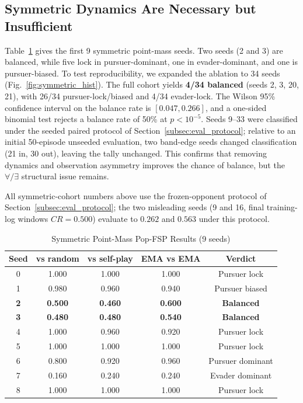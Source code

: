 \documentclass[letterpaper, 10pt, journal]{IEEEtran}
\begin{document}
\subsection{Symmetric Dynamics Are Necessary but Insufficient}
\label{subsec:symmetric_results}

Table~\ref{tab:symmetric} gives the first 9 symmetric point-mass seeds. Two seeds (2 and 3) are balanced, while five lock in pursuer-dominant, one in evader-dominant, and one is pursuer-biased. To test reproducibility, we expanded the ablation to 34 seeds (Fig.~\ref{fig:symmetric_hist}). The full cohort yields \textbf{4/34 balanced} (seeds 2, 3, 20, 21), with 26/34 pursuer-lock/biased and 4/34 evader-lock. The Wilson 95\% confidence interval on the balance rate is $[0.047, 0.266]$, and a one-sided binomial test rejects a balance rate of 50\% at $p < 10^{-5}$. Seeds 9--33 were classified under the seeded paired protocol of Section~\ref{subsec:eval_protocol}; relative to an initial 50-episode unseeded evaluation, two band-edge seeds changed classification (21 in, 30 out), leaving the tally unchanged. This confirms that removing dynamics and observation asymmetry improves the chance of balance, but the $\forall/\exists$ structural issue remains.

All symmetric-cohort numbers above use the frozen-opponent protocol of Section~\ref{subsec:eval_protocol}; the two misleading seeds (9 and 16, final training-log windows $CR=0.500$) evaluate to $0.262$ and $0.563$ under this protocol.

\begin{table}[h]
\centering
\caption{Symmetric Point-Mass Pop-FSP Results (9 seeds)}
\label{tab:symmetric}
\begin{tabular}{@{}ccccc@{}}
\toprule
Seed & vs random & vs self-play & EMA vs EMA & Verdict \\
\midrule
0 & 1.000 & 1.000 & 1.000 & Pursuer lock \\
1 & 0.980 & 0.960 & 0.940 & Pursuer biased \\
\textbf{2} & \textbf{0.500} & \textbf{0.460} & \textbf{0.600} & \textbf{Balanced} \\
\textbf{3} & \textbf{0.480} & \textbf{0.480} & \textbf{0.540} & \textbf{Balanced} \\
4 & 1.000 & 0.960 & 0.920 & Pursuer lock \\
5 & 1.000 & 1.000 & 1.000 & Pursuer lock \\
6 & 0.800 & 0.920 & 0.960 & Pursuer dominant \\
7 & 0.160 & 0.240 & 0.240 & Evader dominant \\
8 & 1.000 & 1.000 & 1.000 & Pursuer lock \\
\bottomrule
\end{tabular}
\end{table}
\end{document}
